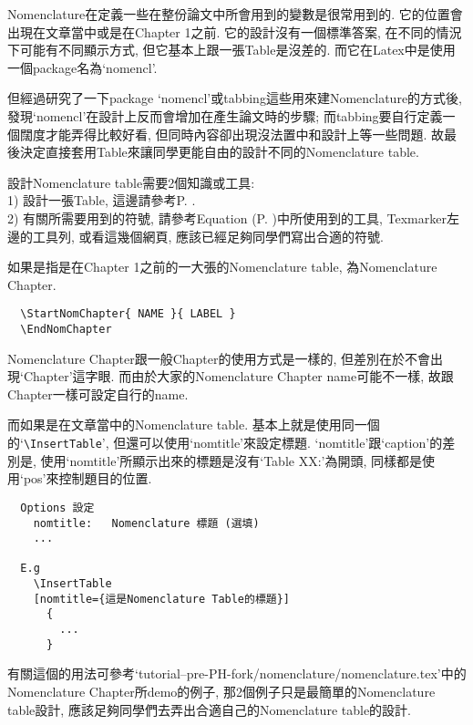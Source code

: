 
Nomenclature在定義一些在整份論文中所會用到的變數是很常用到的. 它的位置會出現在文章當中或是在Chapter 1之前. 它的設計沒有一個標準答案, 在不同的情況下可能有不同顯示方式, 但它基本上跟一張Table是沒差的. 而它在Latex中是使用一個package名為`nomencl'.

但經過研究了一下package `nomencl'或tabbing這些用來建Nomenclature的方式後, 發現`nomencl'在設計上反而會增加在產生論文時的步驟; 而tabbing要自行定義一個闊度才能弄得比較好看, 但同時內容卻出現沒法置中和設計上等一些問題. 故最後決定直接套用Table來讓同學更能自由的設計不同的Nomenclature table.

設計Nomenclature table需要2個知識或工具:\\
1) 設計一張Table, 這邊請參考P. .\\
2) 有關所需要用到的符號, 請參考Equation (P. )中所使用到的工具, Texmarker左邊的工具列, 或看這幾個網頁, 應該已經足夠同學們寫出合適的符號.

{}

如果是指是在Chapter 1之前的一大張的Nomenclature table, 為Nomenclature Chapter.
  \begin{verbatim}
  \StartNomChapter{ NAME }{ LABEL }
  \EndNomChapter
  \end{verbatim}
Nomenclature Chapter跟一般Chapter的使用方式是一樣的, 但差別在於不會出現`Chapter'這字眼. 而由於大家的Nomenclature Chapter name可能不一樣, 故跟Chapter一樣可設定自行的name.

而如果是在文章當中的Nomenclature table. 基本上就是使用同一個的`\verb|\InsertTable|', 但還可以使用`nomtitle'來設定標題. `nomtitle'跟`caption'的差別是, 使用`nomtitle'所顯示出來的標題是沒有`Table XX:'為開頭, 同樣都是使用`pos'來控制題目的位置.

  \begin{DescriptionFrame}
  \begin{verbatim}
  Options 設定
    nomtitle:   Nomenclature 標題 (選填)
    ...

  E.g
    \InsertTable
    [nomtitle={這是Nomenclature Table的標題}]
      {
        ...
      }
  \end{verbatim}
  \end{DescriptionFrame}

有關這個的用法可參考`tutorial--pre-PH-fork/nomenclature/nomenclature.tex'中的Nomenclature Chapter所demo的例子, 那2個例子只是最簡單的Nomenclature table設計, 應該足夠同學們去弄出合適自己的Nomenclature table的設計.
